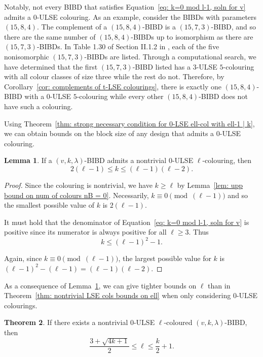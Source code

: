 \documentclass[12pt]{article}
\theoremstyle{definition}
\newtheorem{theorem}{Theorem}[section]
\newtheorem{lemma}[theorem]{Lemma}
\begin{document}
Notably, not every BIBD that satisfies Equation~\eqref{eq: k=0 mod l-1, soln for v} admits a $0$-ULSE colouring. As an example, consider the BIBDs with parameters $(15,8,4)$. The complement of a $(15,8,4)$-BIBD is a $(15,7,3)$-BIBD, and so there are the same number of $(15,8,4)$-BIBDs up to isomorphism as there are $(15,7,3)$-BIBDs. In Table 1.30 of Section II.1.2 in \cite{HCD}, each of the five nonisomorphic $(15,7,3)$-BIBDs are listed. Through a computational search, we have determined that the first $(15,7,3)$-BIBD listed has a $3$-ULSE $5$-colouring with all colour classes of size three while the rest do not. Therefore, by Corollary~\ref{cor: complements of t-LSE colourings}, there is exactly one $(15,8,4)$-BIBD with a $0$-ULSE $5$-colouring while every other $(15,8,4)$-BIBD does not have such a colouring.

Using Theorem~\ref{thm: strong necessary condition for 0-LSE ell-col with ell-1 | k}, we can obtain bounds on the block size of any design that admits a $0$-ULSE colouring.

\begin{lemma}\label{lem: k=0 mod l-1, bounds on k}
    If a $(v,k,\lambda)$-BIBD admits a nontrivial $0$-ULSE $\ell$-colouring, then \[2(\ell - 1) \leq k \leq (\ell - 1)(\ell - 2).\]
\end{lemma}

\begin{proof}
    Since the colouring is nontrivial, we have $k \geq \ell$ by Lemma~\ref{lem: upp bound on num of colours nB = 0}. Necessarily, $k\equiv 0 \pmod{(\ell - 1)}$ and so the smallest possible value of $k$ is $2(\ell -1)$. 

    It must hold that the denominator of Equation~\eqref{eq: k=0 mod l-1, soln for v} is positive since its numerator is always positive for all $\ell \geq 3$. Thus 
    \[k \leq (\ell - 1)^2 - 1.\]

    Again, since $k\equiv 0 \pmod{(\ell - 1)}$, the largest possible value for $k$ is $(\ell - 1)^2 - (\ell - 1) = (\ell - 1)(\ell - 2)$. 
\end{proof}

As a consequence of Lemma~\ref{lem: k=0 mod l-1, bounds on k}, we can give tighter bounds on $\ell$ than in Theorem~\ref{thm: nontrivial LSE cols bounds on ell} when only considering $0$-ULSE colourings.

\begin{theorem}\label{thm: 0-ULSE bounds on ell}
    If there exists a nontrivial $0$-ULSE $\ell$-coloured $(v,k,\lambda)$-BIBD, then \[\frac{3 + \sqrt{4k+1}}{2} \leq \ell \leq \frac{k}{2}+1.\]
\end{theorem}
\end{document}
